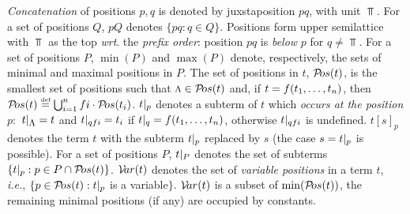 {\em Concatenation} of positions $p,q$ is denoted by juxstaposition \(pq\),
with unit \(\Top\).  
For a set of positions $Q$, \(pQ\) denotes \(\{pq: q\in Q\}\).  
Positions form upper semilattice
with $\Top$ as the top {\it wrt}. the {\em prefix order}:
position \(pq\) is {\em below} $p$ for \(q\neq \Top\).  For a set of
positions $P$, \(\min(P)\) and \(\max(P)\) denote, respectively, the sets of
minimal and maximal positions in $P$.  The set of positions in $t$, \(\Pos
t\), is the smallest set of positions such that \(\Top \in \Pos t\) and, if
\(t=f(\List tn,)\), then \(\Pos t\Def \bigcup_{i=1}^n fi\cdot\Pos {t_i}\).
$\subterm tp$ denotes a subterm of $t$ which {\em occurs at the position} $p:$
\(\subterm t\Top= t\) and \(\subterm t{qfi}=t_i\) if \(\subterm tq=f(\List
tn,)\), otherwise \(\subterm t{qfi}\) is undefined.
$t[s]_p$ denotes the term $t$ with the
subterm \(\subterm tp\) replaced by $s$ (the case \(s=\subterm tp\) is
possible).
For a set of positions $P$, \(\subterm tP\) denotes the set of subterms
\(\{\subterm tp:p\in P\cap \Pos t\}\).
\(\Var t\) denotes the set of {\em variable positions} in a term $t$,
{\it i.e.}, \(\{p\in\Pos t:\subterm tp\) is a variable$\}$.  %
\(\Var t\) is a subset of \(\min
(\Pos t)\), the remaining minimal positions (if any) are occupied by
constants.
%

